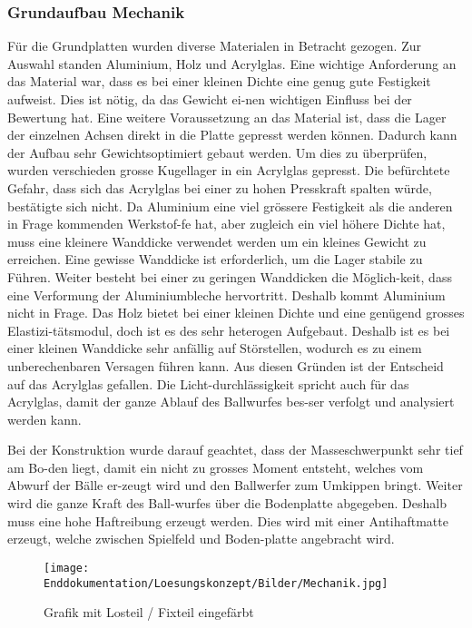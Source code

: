 \subsubsection{Grundaufbau Mechanik}
Für die Grundplatten wurden diverse Materialen in Betracht gezogen. Zur Auswahl standen Aluminium, Holz und Acrylglas. Eine wichtige Anforderung an das Material war, dass es bei einer kleinen Dichte eine genug gute Festigkeit aufweist. Dies ist nötig, da das Gewicht ei-nen wichtigen Einfluss bei der Bewertung hat. Eine weitere Voraussetzung an das Material ist, dass die Lager der einzelnen Achsen direkt in die Platte gepresst werden können. Dadurch kann der Aufbau sehr Gewichtsoptimiert gebaut werden. Um dies zu überprüfen, wurden verschieden grosse Kugellager in ein Acrylglas gepresst. Die befürchtete Gefahr, dass sich das Acrylglas bei einer zu hohen Presskraft spalten würde, bestätigte sich nicht. Da Aluminium eine viel grössere Festigkeit als die anderen in Frage kommenden Werkstof-fe hat, aber zugleich ein viel höhere Dichte hat, muss eine kleinere Wanddicke verwendet werden um ein kleines Gewicht zu erreichen. Eine gewisse Wanddicke ist erforderlich, um die Lager stabile zu Führen. Weiter besteht bei einer zu geringen Wanddicken die Möglich-keit, dass eine Verformung der Aluminiumbleche hervortritt. Deshalb kommt Aluminium nicht in Frage. Das Holz bietet bei einer kleinen Dichte und eine genügend grosses Elastizi-tätsmodul, doch ist es des sehr heterogen Aufgebaut. Deshalb ist es bei einer kleinen Wanddicke sehr anfällig auf Störstellen, wodurch es zu einem unberechenbaren Versagen führen kann. Aus diesen Gründen ist der Entscheid auf das Acrylglas gefallen. Die Licht-durchlässigkeit spricht auch für das Acrylglas, damit der ganze Ablauf des Ballwurfes bes-ser verfolgt und analysiert werden kann. 

Bei der Konstruktion wurde darauf geachtet, dass der Masseschwerpunkt sehr tief am Bo-den liegt, damit ein nicht zu grosses Moment entsteht, welches vom Abwurf der Bälle er-zeugt wird und den Ballwerfer zum Umkippen bringt. Weiter wird die ganze Kraft des Ball-wurfes über die Bodenplatte abgegeben. Deshalb muss eine hohe Haftreibung erzeugt werden. Dies wird mit einer Antihaftmatte erzeugt, welche zwischen Spielfeld und Boden-platte angebracht wird.
\begin{figure}
		\centering
		\texttt{[image: Enddokumentation/Loesungskonzept/Bilder/Mechanik.jpg]}
		\caption{Grafik mit Losteil / Fixteil eingefärbt}
		\label{fig:Mechanik}	
\end{figure}

